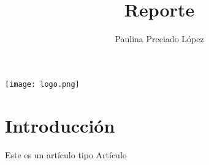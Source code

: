 \documentclass[12pt]{article}
\title{Reporte}
\author{Paulina Preciado López}
\begin{document}
\maketitle
\begin{center}
\texttt{[image: logo.png]}
\end{center}

\section*{Introducci\'on}

Este es un art\'iculo tipo
Artículo
\end{document}
